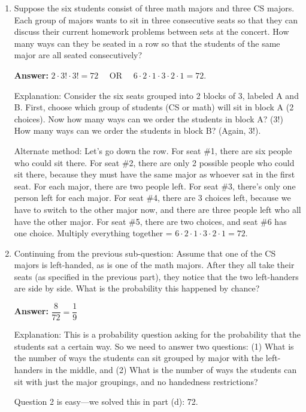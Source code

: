 \documentclass[11pt, letterpaper]{report}
\begin{document}
\begin{enumerate}
\begin{enumerate}
\item Suppose the six students consist of three math majors and three CS majors. Each group of majors wants to sit in three consecutive seats so that they can discuss their current homework problems between sets at the concert. How many ways can they be seated in a row so that the students of the same major are all seated consecutively?

\textbf{Answer: } $2\cdot 3! \cdot 3! = 72$  \ \ OR  \ \ $6 \cdot 2 \cdot 1 \cdot 3
\cdot 2 \cdot 1 = 72$.
 

Explanation: Consider the six seats grouped into 2 blocks of 3, labeled A and B.
First, choose which group of students (CS or math) will sit in block A (2 choices).  Now
how many ways can we order the students in block A?  (3!)  How many ways can we order the
students in block B?  (Again, 3!).

Alternate method: Let's go down the row.  For seat \#1, there are six people who could sit there.
For seat \#2, there are only 2 possible people who could sit there, because they must have the same
major as whoever sat in the first seat.  For each major, there are two people left.  For seat \#3, there's
only one person left for each major.  For seat \#4, there are 3 choices left, because we have to switch
to the other major now, and there are three people left who all have the other major.  For seat \#5, there
are two choices, and seat \#6 has one choice.  Multiply everything together = $6 \cdot 2 \cdot 1 \cdot 3
\cdot 2 \cdot 1 = 72$.



\item Continuing from the previous sub-question: Assume that one of the CS majors is left-handed, as is one of the math majors.  After they all take their seats (as specified in the
previous part), they notice that the two left-handers are side by side.  What is the probability this happened by chance?

\textbf{Answer:} $\dfrac{8}{72}=\dfrac{1}{9}$

Explanation: This is a probability question asking for the probability that the students sat a certain way.
So we need to answer two questions: (1) What is the number of ways the students can sit grouped by major
with the left-handers in the middle, and (2) What is the number of ways the students can sit with just the major
groupings, and no handedness restrictions?

Question 2 is easy---we solved this in part (d): 72.


\end{enumerate}
\end{enumerate}
\end{document}
